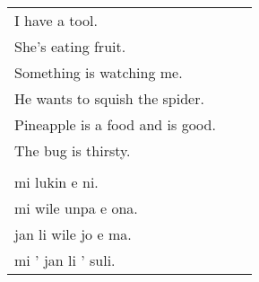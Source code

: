 \begin{supertabular}{p{5,5cm}|ll}
I have a tool. &&  \\ %
She's eating fruit. &&  \\ %
Something is watching me. &&  \\ %
He wants to squish the spider. &&  \\ %
Pineapple is a food and is good. &&  \\ %
The bug is thirsty. && \\ %
  && \\ %
mi lukin e ni. &&  \\ %
mi wile unpa e ona. &&   \\ %
jan li wile jo e ma. &&  \\ %
mi ' jan li ' suli. &&  \\ %
\end{supertabular} 
